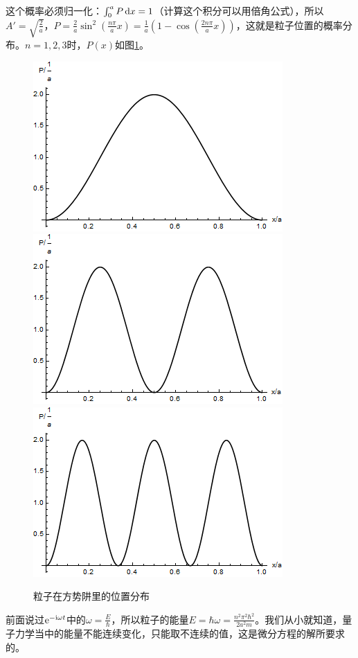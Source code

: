 这个概率必须归一化：$\int_0^a P \mathop{}\!\mathrm{d} x=1$（计算这个积分可以用倍角公式），所以$A'=\sqrt{\frac{2}{a}}$，$P=\frac{2}{a} \sin^2 (\frac{n \pi}{a} x)=\frac{1}{a} (1-\cos(\frac{2 n \pi}{a} x))$，这就是粒子位置的概率分布。$n=1,2,3$时，$P(x)$如图\ref{fig-square-well}。
\begin{figure}[htb]
\centering
\includegraphics[scale=0.4]{fig/square-well}
\includegraphics[scale=0.4]{fig/square-well-2}
\includegraphics[scale=0.4]{fig/square-well-3}
\caption{粒子在方势阱里的位置分布}
\label{fig-square-well}
\end{figure}

前面说过$\mathrm{e}^{-\mathrm{i} \omega t}$中的$\omega=\frac{E}{\hbar}$，所以粒子的能量$E=\hbar \omega=\frac{n^2 \pi^2 \hbar^2}{2 a^2 m}$。我们从小就知道，量子力学当中的能量不能连续变化，只能取不连续的值，这是微分方程的解所要求的。

